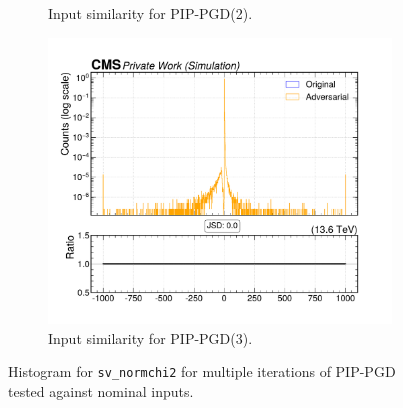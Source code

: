 \begin{figure}[htbp]
\begin{subfigure}[t]{0.32\textwidth}
    \caption*{Input similarity for PIP-PGD(2).}
  \end{subfigure}\hfill
  \begin{subfigure}[t]{0.32\textwidth}
    \includegraphics[width=\linewidth]{media/output/features/compare/combined_it_3/cmp_vtx_arr_sv_normchi2.pdf}
    \caption*{Input similarity for PIP-PGD(3).}
  \end{subfigure}

  \caption*{Histogram for \texttt{sv\_normchi2} for multiple iterations of PIP-PGD tested against nominal inputs.}
  \label{fig:combined_input_sv_normchi2}
\end{figure}

